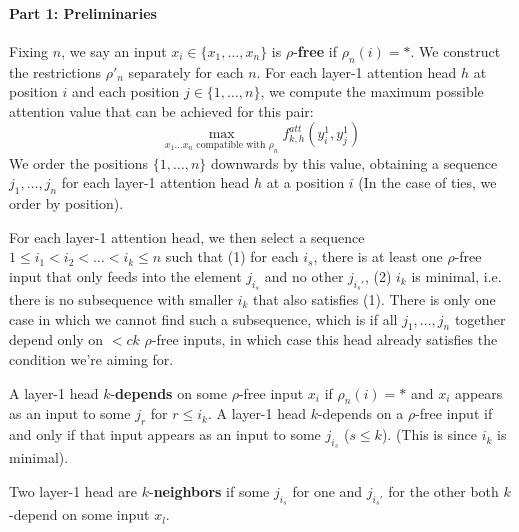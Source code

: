 \documentclass[11pt,a4paper]{article}
\newcommand{\key}[1]{\textbf{#1}}
\begin{document}
\paragraph{Part 1: Preliminaries}


Fixing $n$, we say an input $x_i \in \{x_1, ..., x_n\}$ is $\rho$-\key{free} if $\rho_n(i) = *$.
We construct the restrictions $\rho'_n$ separately for each $n$.
For each layer-1 attention head $h$ at position $i$ and each position $j \in \{1, \dots, n\}$, we compute the maximum possible attention value that can be achieved for this pair:
\begin{equation}
\max_{x_1\dots x_n \text{ compatible with } \rho_n} f^{att}_{k,h}(y_i^{1}, y^{1}_j)
\end{equation}
We order the positions $\{1, \dots, n\}$ downwards by this value, obtaining a sequence $j_1, \dots, j_n$ for each layer-1 attention head $h$ at a position $i$ (In the case of ties, we order by  position).

For each layer-1 attention head, we then select a sequence $1 \leq i_1 < i_2 < \dots < i_k \leq n$ such that (1) for each $i_s$, there is at least one $\rho$-free input that only feeds into the element $j_{i_s}$ and no other $j_{i_s'}$, (2) $i_k$ is minimal, i.e. there is no subsequence with smaller $i_k$ that also satisfies (1).
There is only one case in which we cannot find such a subsequence, which is if all $j_1, \dots, j_n$ together depend only on $< ck$ $\rho$-free inputs, in which case this head already satisfies the condition we're aiming for.

A layer-1 head $k$-\textbf{depends} on some $\rho$-free input $x_i$ if $\rho_n(i) = *$ and $x_i$ appears as an input to some $j_r$ for $r \leq i_k$.
A layer-1 head $k$-depends on a $\rho$-free input if and only if that input appears as an input to some $j_{i_s}$ ($s \leq k$). (This is since $i_k$ is minimal).

Two layer-1 head are $k$-\textbf{neighbors} if some $j_{i_s}$ for one and $j_{i_s'}$ for the other both $k$-depend on some input $x_l$.
\end{document}
